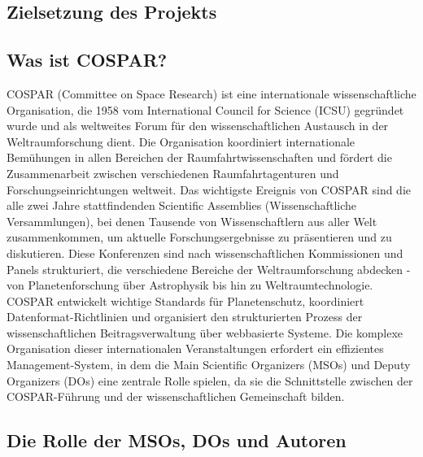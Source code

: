 \documentclass[11pt,a4paper]{article}
\begin{document}
\subsection{Zielsetzung des Projekts}

\subsection{Was ist COSPAR?}
COSPAR (Committee on Space Research) ist eine internationale wissenschaftliche Organisation, die 1958 vom International Council for Science (ICSU) gegründet wurde und als weltweites Forum für den wissenschaftlichen Austausch in der Weltraumforschung dient. Die Organisation koordiniert internationale Bemühungen in allen Bereichen der Raumfahrtwissenschaften und fördert die Zusammenarbeit zwischen verschiedenen Raumfahrtagenturen und Forschungseinrichtungen weltweit. Das wichtigste Ereignis von COSPAR sind die alle zwei Jahre stattfindenden Scientific Assemblies (Wissenschaftliche Versammlungen), bei denen Tausende von Wissenschaftlern aus aller Welt zusammenkommen, um aktuelle Forschungsergebnisse zu präsentieren und zu diskutieren. Diese Konferenzen sind nach wissenschaftlichen Kommissionen und Panels strukturiert, die verschiedene Bereiche der Weltraumforschung abdecken - von Planetenforschung über Astrophysik bis hin zu Weltraumtechnologie. COSPAR entwickelt wichtige Standards für Planetenschutz, koordiniert Datenformat-Richtlinien und organisiert den strukturierten Prozess der wissenschaftlichen Beitragsverwaltung über webbasierte Systeme. Die komplexe Organisation dieser internationalen Veranstaltungen erfordert ein effizientes Management-System, in dem die Main Scientific Organizers (MSOs) und Deputy Organizers (DOs) eine zentrale Rolle spielen, da sie die Schnittstelle zwischen der COSPAR-Führung und der wissenschaftlichen Gemeinschaft bilden.

\subsection{Die Rolle der MSOs, DOs und Autoren}
\end{document}
